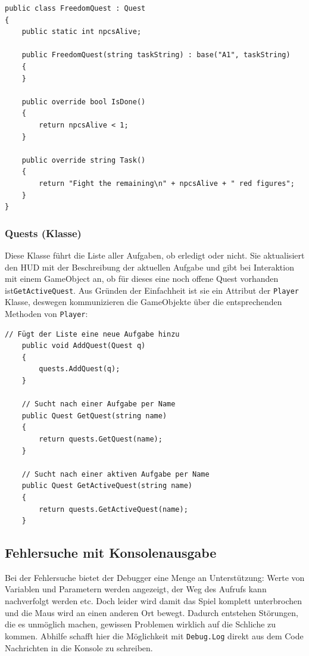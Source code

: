 \begin{lstlisting}[caption={FreedomQuest Subklasse}]
public class FreedomQuest : Quest
{
    public static int npcsAlive;

    public FreedomQuest(string taskString) : base("A1", taskString)
    {
    }

    public override bool IsDone()
    {
        return npcsAlive < 1;
    }

    public override string Task()
    {
        return "Fight the remaining\n" + npcsAlive + " red figures";
    }
}
\end{lstlisting}


\subsubsection{Quests (Klasse)}
Diese Klasse führt die Liste aller Aufgaben, ob erledigt oder nicht. Sie  aktualisiert den HUD mit der Beschreibung der aktuellen Aufgabe und gibt bei Interaktion mit einem GameObject an, ob für dieses eine noch offene Quest vorhanden ist\lstinline{GetActiveQuest}. Aus Gründen der Einfachheit ist sie ein Attribut der \lstinline{Player} Klasse, deswegen kommunizieren die GameObjekte über die entsprechenden Methoden von \lstinline{Player}:

\begin{lstlisting}[caption={Schnittstelle für Aufgaben in der Klasse Player}]
	// Fügt der Liste eine neue Aufgabe hinzu
	public void AddQuest(Quest q)
	{
		quests.AddQuest(q);
	}

	// Sucht nach einer Aufgabe per Name
	public Quest GetQuest(string name)
	{
		return quests.GetQuest(name);
	}

	// Sucht nach einer aktiven Aufgabe per Name
	public Quest GetActiveQuest(string name)
	{
		return quests.GetActiveQuest(name);
	}
\end{lstlisting}

\subsection{Fehlersuche mit Konsolenausgabe}

Bei der Fehlersuche bietet der Debugger eine Menge an Unterstützung: Werte von Variablen und Parametern werden angezeigt, der Weg des Aufrufs kann nachverfolgt werden etc. Doch leider wird damit das Spiel komplett unterbrochen und die Maus wird an einen anderen Ort bewegt. Dadurch entstehen Störungen, die es unmöglich machen, gewissen Problemen wirklich auf die Schliche zu kommen. Abhilfe schafft hier die Möglichkeit mit \lstinline{Debug.Log} direkt aus dem Code Nachrichten in die Konsole zu schreiben.

